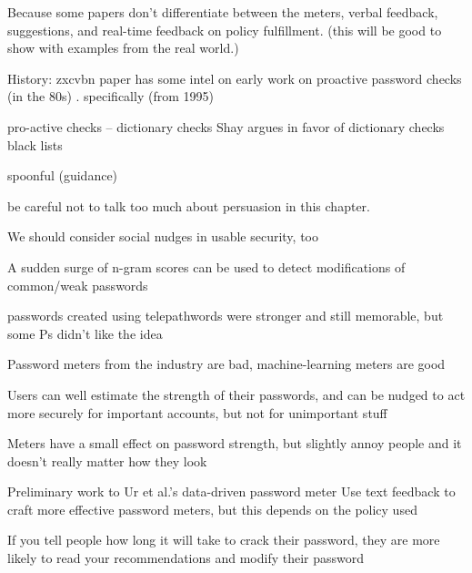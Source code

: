 	 Because some papers don't differentiate between the meters, verbal feedback, suggestions, and real-time feedback on policy fulfillment. (this will be good to show with examples from the real world.)
	
	
	
	History: zxcvbn paper has some intel on early work on proactive password checks (in the 80s) \cite{Wheeler2016zxcvbn}. specifically (from 1995) \cite{Bishop1995ProactivePasswordChecking}
	
	
	pro-active checks -- dictionary checks Shay argues in favor of dictionary checks \cite{Shay2014CanLongPasswordsBeSecureAndUsable} 
	black lists \cite{Habib2017Blacklists} 
	
	spoonful (guidance) \cite{Shay2015SpoonfulOfSugar}
	\cite{Forget2008ImprovingPasswordsThroughPersuasion}
	
	be careful not to talk too much about persuasion in this chapter. 
	
	We should consider social nudges in usable security, too \cite{DiGioia2005SocialNavigationUsableSecurity}
	
	
	A sudden surge of n-gram scores can be used to detect modifications of common/weak passwords \cite{Tupsamudre2016MarkovStrength}
	
	
	passwords created using telepathwords were stronger and still memorable, but some Ps didn't like the idea \cite{Komanduri2014Telepathwords}
	
	Password meters from the industry are bad, machine-learning meters are good \cite{Wang2016fuzzyPWM}
	
	Users can well estimate the strength of their passwords, and can be nudged to act more securely for important accounts, but not for unimportant stuff \cite{Egelman2013DoesMyPasswordGoUpToEleven}
	
	Meters have a small effect on password strength, but slightly annoy people and it doesn't really matter how they look \cite{Ur2012HowDoesYourPasswordMeasureUp}
	
	Preliminary work to Ur et al.'s data-driven password meter \cite{Eargle2015YouCanDoBetter}
	Use text feedback to craft more effective password meters, but this depends on the policy used \cite{Ur2017DataDrivenPWMeter}
	
	If you tell people how long it will take to crack their password, they are more likely to read your recommendations and modify their password \cite{Vance2013FearAppeals}
	
